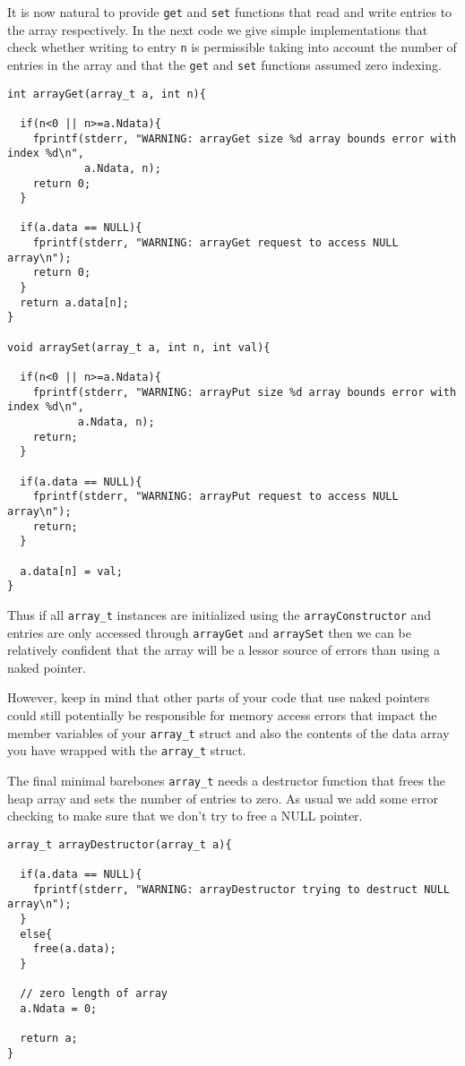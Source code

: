 It is now natural to provide \texttt{get} and \texttt{set} functions that read and write entries to the array respectively.  In the next code we give simple implementations that check whether writing to entry \texttt{n} is permissible taking into account the number of entries in the array and that the \texttt{get} and \texttt{set} functions assumed zero indexing.

\begin{verbatim}
int arrayGet(array_t a, int n){

  if(n<0 || n>=a.Ndata){
    fprintf(stderr, "WARNING: arrayGet size %d array bounds error with index %d\n",
            a.Ndata, n);
    return 0;
  }

  if(a.data == NULL){
    fprintf(stderr, "WARNING: arrayGet request to access NULL array\n");
    return 0;
  }
  return a.data[n];
}

void arraySet(array_t a, int n, int val){

  if(n<0 || n>=a.Ndata){
    fprintf(stderr, "WARNING: arrayPut size %d array bounds error with index %d\n",
           a.Ndata, n);
    return;
  }

  if(a.data == NULL){
    fprintf(stderr, "WARNING: arrayPut request to access NULL array\n");
    return;
  }

  a.data[n] = val;
}
\end{verbatim}

Thus if all \texttt{array\_t} instances are initialized using the \texttt{arrayConstructor} and entries are only accessed through \texttt{arrayGet} and \texttt{arraySet} then we can be relatively confident that the array will be a lessor source of errors than using a naked pointer. 

However, keep in mind that other parts of your code that use naked pointers could still potentially be responsible for memory access errors that impact the member variables of your \texttt{array\_t} struct and also the contents of the data array you have wrapped with the \texttt{array\_t} struct.

The final minimal barebones \texttt{array\_t} needs a destructor function that frees the heap array and sets the number of entries to zero. As usual we add some error checking to make sure that we don't try to free a NULL pointer.

\begin{verbatim}
array_t arrayDestructor(array_t a){

  if(a.data == NULL){
    fprintf(stderr, "WARNING: arrayDestructor trying to destruct NULL array\n");
  }
  else{
    free(a.data);
  }

  // zero length of array            
  a.Ndata = 0;

  return a;
}
\end{verbatim}

